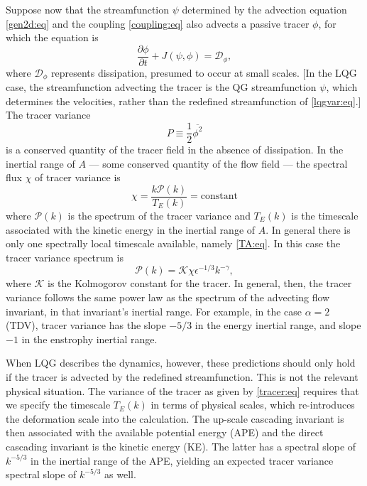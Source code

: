 \documentclass{jfm}
\newcommand{\ca}  [1]{\mathcal{#1}}
\newcommand{\p}   {\partial}
\newcommand{\pp}  [2]{\frac{\p #1}{\p #2}}
\begin{document}
Suppose now that the streamfunction $\psi$ determined by the advection
equation \eqref{gen2d:eq} and the coupling \eqref{coupling:eq} also
advects a passive tracer $\phi$, for which the equation is
\begin{equation}
\pp{\phi}{t} + J(\psi,\phi) = \ca{D}_{\phi},
\label{tracer:eq}
\end{equation}
where $\ca{D}_{\phi}$ represents dissipation, presumed to occur at
small scales.  [In the LQG case, the streamfunction advecting the
tracer is the QG streamfunction $\psi$, which determines the
velocities, rather than the redefined streamfunction of
\eqref{lqgvar:eq}.] The tracer variance
\begin{equation}
P \equiv \frac{1}{2}\overline{\phi^2}
\label{P:eq}
\end{equation}
is a conserved quantity of the tracer field in the absence of
dissipation.  In the inertial range of $A$ --- some conserved quantity
of the flow field --- the spectral flux $\chi$ of tracer variance is
\begin{equation}
\chi = \frac{k\ca{P}(k)}{T_E(k)} = \textrm{constant}
\label{epsP:eq}
\end{equation}
where $\ca{P}(k)$ is the spectrum of the tracer variance and
$T_E(k)$ is the timescale associated with the kinetic energy in
the inertial range of $A$.  In general there is only one
spectrally local timescale available, namely \eqref{TA:eq}.  In
this case the tracer variance spectrum is
\begin{equation}
\ca{P}(k) = \ca{K}\chi\epsilon^{-1/3}k^{-\gamma},
\label{PE:eq}
\end{equation}
where $\ca{K}$ is the Kolmogorov constant for the tracer. In
general, then, the tracer variance follows the same power law as
the spectrum of the advecting flow invariant, in that invariant's
inertial range.  For example, in the case $\alpha=2$ (TDV), tracer
variance has the slope $-5/3$ in the energy inertial range, and
slope $-1$ in the enstrophy inertial range.

When LQG describes the dynamics, however, these predictions should
only hold if the tracer is advected by the redefined streamfunction.
This is not the relevant physical situation.  The variance of the
tracer as given by \eqref{tracer:eq} requires that we specify the
timescale $T_E(k)$ in terms of physical scales, which re-introduces
the deformation scale into the calculation.  The up-scale cascading
invariant is then associated with the available potential energy (APE)
and the direct cascading invariant is the kinetic energy (KE).  The
latter has a spectral slope of $k^{-5/3}$ in the inertial range of the
APE, yielding an expected tracer variance spectral slope of $k^{-5/3}$
as well.
\end{document}
